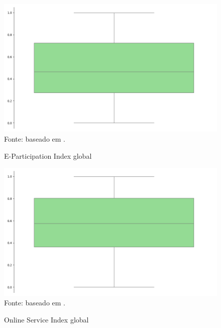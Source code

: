 \begin{figure}[H]
    \centering
    \caption{E-Participation Index global}
    \includegraphics[width=1\linewidth]{figuras/egdi/boxplot_epart_global.png}
    \label{fig:boxplot_epart_global}
    \footnotesize{Fonte: baseado em \cite{ONU_edgi_mapa}.}
\end{figure}

\begin{figure}[H]
    \centering
    \caption{Online Service Index global}
    \includegraphics[width=1\linewidth]{figuras/egdi/boxplot_osi_global.png}
    \label{fig:boxplot_osi_global}
    \footnotesize{Fonte: baseado em \cite{ONU_edgi_mapa}.}
\end{figure}

